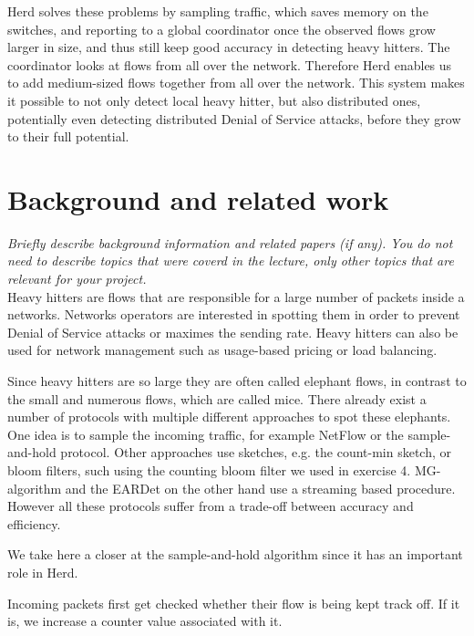 \documentclass[11pt,oneside,a4paper]{article}
\newcommand{\hint}[1]{{\color{blue} \em #1}}
\begin{document}
Herd solves these problems by sampling traffic, which saves memory on the switches, and reporting to a global coordinator once the observed flows grow larger in size, and thus still keep good accuracy in detecting heavy hitters. The coordinator looks at flows from all over the network. Therefore Herd enables us to add medium-sized flows together from all over the network. This system makes it possible to not only detect local heavy hitter, but also distributed ones, potentially even detecting distributed Denial of Service attacks, before they grow to their full potential.


\section{Background and related work}
\hint{Briefly describe background information and related papers (if any). You do not need to describe topics that were coverd in the lecture, only other topics that are relevant for your project.} \\
Heavy hitters are flows that are responsible for a large number of packets inside a networks. Networks operators are interested in spotting them in order to prevent Denial of Service attacks or maximes the sending rate. Heavy hitters can also be used for network management such as usage-based pricing or load balancing.

Since heavy hitters are so large they are often called elephant flows, in contrast to the small and numerous flows, which are called mice. There already exist a number of protocols with multiple different approaches to spot these elephants. One idea is to sample the incoming traffic, for example NetFlow\cite{claise2004netflow} or the sample-and-hold protocol\cite{estan2003sample}. Other approaches use sketches, e.g. the count-min sketch\cite{cormode2003countmin}, or bloom filters, such using the counting bloom filter we used in exercise 4. MG-algorithm\cite{mg1982repeat} and the EARDet\cite{wu2014eardet} on the other hand use a streaming based procedure. 
However all these protocols suffer from a trade-off between accuracy and efficiency.

We take here a closer at the sample-and-hold algorithm\cite{} since it has an important role in Herd.

Incoming packets first get checked whether their flow is being kept track off. If it is, we increase a counter value associated with it.
\end{document}
